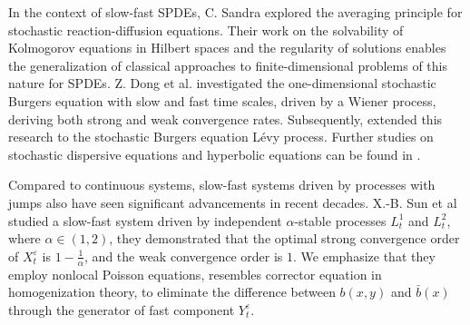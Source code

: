 \documentclass[11pt,reqno]{amsart}
\numberwithin{equation}{section}
\begin{document}
In the context of slow-fast SPDEs, C. Sandra \cite{CF} explored the averaging principle for stochastic reaction-diffusion equations. Their work on the solvability of Kolmogorov equations in Hilbert spaces and the regularity of solutions enables the generalization of classical approaches to finite-dimensional problems of this nature for SPDEs. Z. Dong et al. \cite{DSXZ} investigated the one-dimensional stochastic Burgers equation with slow and fast time scales, driven by a Wiener process, deriving both strong and weak convergence rates. Subsequently, \cite{YXJ}  extended this research to the stochastic Burgers equation Lévy process. Further studies on stochastic dispersive equations and hyperbolic  equations can be found in \cite{CSS,WC,PG,FWL,PXW}.

Compared to continuous systems, slow-fast systems driven by processes with jumps also have seen significant advancements in recent decades. X.-B. Sun et al \cite{SXX} studied a slow-fast system driven by  independent $\alpha$-stable processes $L^{1}_{t}$ and $L^{2}_{t}$, where $\alpha\in(1,2)$,
they demonstrated that the optimal strong convergence  order of $X^{\varepsilon}_{t}$ is $1-\frac{1}{\alpha}$, and the weak convergence order is $1$. We emphasize that they employ nonlocal Poisson equations, resembles corrector equation in homogenization theory, to eliminate the difference between $b(x,y)$ and $\bar{b}(x)$ through the generator of fast component  $Y^{\varepsilon}_{t}$. 
\end{document}

